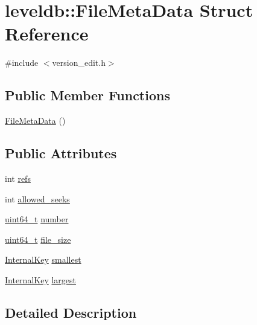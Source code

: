 \hypertarget{structleveldb_1_1_file_meta_data}{}\section{leveldb\+:\+:File\+Meta\+Data Struct Reference}
\label{structleveldb_1_1_file_meta_data}


{\ttfamily \#include $<$version\+\_\+edit.\+h$>$}

\subsection*{Public Member Functions}
\begin{DoxyCompactItemize}
\item 
\hyperlink{structleveldb_1_1_file_meta_data_ab809d499cd560df58cc5c529bb69980a}{File\+Meta\+Data} ()
\end{DoxyCompactItemize}
\subsection*{Public Attributes}
\begin{DoxyCompactItemize}
\item 
int \hyperlink{structleveldb_1_1_file_meta_data_a199e4ba2167c8facad8bd41269982935}{refs}
\item 
int \hyperlink{structleveldb_1_1_file_meta_data_a63f9a0149290c7b22bbc871da6b4f619}{allowed\+\_\+seeks}
\item 
\hyperlink{stdint_8h_aaa5d1cd013383c889537491c3cfd9aad}{uint64\+\_\+t} \hyperlink{structleveldb_1_1_file_meta_data_adc63bac3e06fd4387ebb9f085fc88fe7}{number}
\item 
\hyperlink{stdint_8h_aaa5d1cd013383c889537491c3cfd9aad}{uint64\+\_\+t} \hyperlink{structleveldb_1_1_file_meta_data_a778ea9c773ad4fdfe4408eecaae754f7}{file\+\_\+size}
\item 
\hyperlink{classleveldb_1_1_internal_key}{Internal\+Key} \hyperlink{structleveldb_1_1_file_meta_data_a9e5e5c149495aede836ac637cd89269f}{smallest}
\item 
\hyperlink{classleveldb_1_1_internal_key}{Internal\+Key} \hyperlink{structleveldb_1_1_file_meta_data_a410718ba1868392b298d05a774dd07d1}{largest}
\end{DoxyCompactItemize}


\subsection{Detailed Description}



